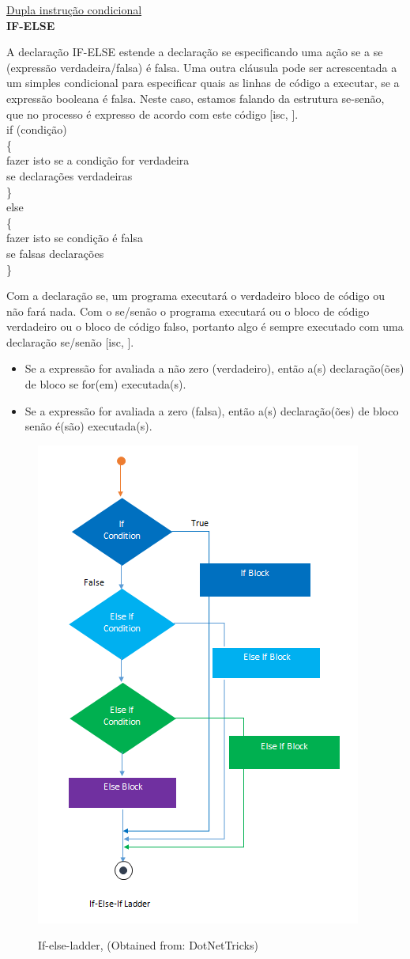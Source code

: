 \documentclass[11pt, letterpaper, portuguese]{article}
\begin{document}
\underline{Dupla instrução condicional}
\\
\textbf{IF-ELSE}

\par{A declaração IF-ELSE estende a declaração se especificando uma ação se a se (expressão verdadeira/falsa)
é falsa.
Uma outra cláusula pode ser acrescentada a um simples condicional para especificar quais as linhas de código a executar, se a expressão booleana é falsa. Neste caso, estamos falando da estrutura se-senão, que no processo é expresso de acordo com este código [isc, ].}
\\
if (condição)\\
\{ \\
   fazer isto se a condição for verdadeira\\
   se declarações verdadeiras\\
\} \\
else \\
\{ \\
fazer isto se condição é falsa \\
se falsas declarações \\
\}
\par{Com a declaração se, um programa executará o verdadeiro bloco de código ou não fará nada. Com o se/senão o programa executará ou o bloco de código verdadeiro ou o bloco de código falso, portanto algo é sempre executado com uma declaração se/senão [isc, ].}
\begin{itemize}
    \item  Se a expressão for avaliada a não zero (verdadeiro), então a(s) declaração(ões) de bloco se for(em) executada(s).
    \item{Se a expressão for avaliada a zero (falsa), então a(s) declaração(ões) de bloco senão é(são) executada(s).}
\end{itemize}
\begin{figure}
	    \centering
		\caption{If-else-ladder, (Obtained from: {DotNetTricks})}
		\includegraphics[width=0.2 \textwidth]{if-else-if ladder.png}
		\label{Imagen_If-else}
	\end{figure}
	
\end{document}
